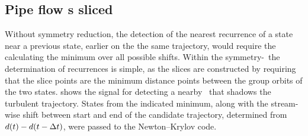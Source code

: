 \subsection{Pipe flow \rpo s sliced}
\label{s:rpos}

 Without symmetry reduction, the detection
of the nearest recurrence of a state near a previous state, earlier on the
the same trajectory,
would require the calculating the minimum over all possible shifts.
Within the symmetry-\reducedsp\ the determination of recurrences is simple,
as the slices are constructed by requiring that the slice points are
the minimum distance points between the group orbits of the two states.
 shows the signal for detecting a nearby \rpo\
that shadows the turbulent trajectory.  States from the indicated minimum,
along with the stream-wise shift between start and end of the candidate trajectory,
determined from $d(t)-d(t-\Delta t)$,
were passed to the Newton--Krylov code.

